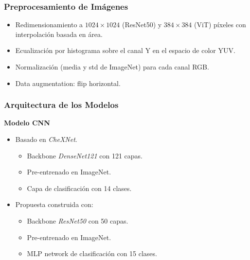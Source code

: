 \begin{frame}
\frametitle{Preprocesamiento de Imágenes}
\begin{itemize}
    \item Redimensionamiento a $1024 \times 1024$ (ResNet50) y $384 \times 384$ (ViT) píxeles con interpolación basada en área.
    \item Ecualización por histograma sobre el canal Y en el espacio de color YUV.
    \item Normalización (media y std de ImageNet) para cada canal RGB.
    \item Data augmentation: flip horizontal.
\end{itemize}
\end{frame}

\begin{frame}
\frametitle{Arquitectura de los Modelos}
    \textbf{Modelo CNN}
    \begin{itemize}
        \item Basado en \textit{CheXNet}.
        \begin{itemize}
            \item Backbone \textit{DenseNet121} con 121 capas.
            \item Pre-entrenado en ImageNet.
            \item Capa de clasificación con 14 clases.
        \end{itemize}
        \item Propuesta construida con:
        \begin{itemize}
            \item Backbone \textit{ResNet50} con 50 capas.
            \item Pre-entrenado en ImageNet.
            \item MLP network de clasificación con 15 clases.
        \end{itemize}
    \end{itemize}
\end{frame}


